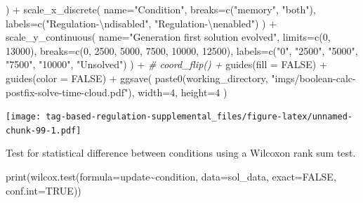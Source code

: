 \documentclass[
]{book}
\newenvironment{Shaded}{\begin{snugshade}}{\end{snugshade}}
\newcommand{\AttributeTok}[1]{\textcolor[rgb]{0.77,0.63,0.00}{#1}}
\newcommand{\CommentTok}[1]{\textcolor[rgb]{0.56,0.35,0.01}{\textit{#1}}}
\newcommand{\ConstantTok}[1]{\textcolor[rgb]{0.00,0.00,0.00}{#1}}
\newcommand{\DecValTok}[1]{\textcolor[rgb]{0.00,0.00,0.81}{#1}}
\newcommand{\FunctionTok}[1]{\textcolor[rgb]{0.00,0.00,0.00}{#1}}
\newcommand{\NormalTok}[1]{#1}
\newcommand{\SpecialCharTok}[1]{\textcolor[rgb]{0.00,0.00,0.00}{#1}}
\newcommand{\StringTok}[1]{\textcolor[rgb]{0.31,0.60,0.02}{#1}}
\begin{document}
\begin{Shaded}
\begin{Highlighting}[]
\NormalTok{  ) }\SpecialCharTok{+}
  \FunctionTok{scale\_x\_discrete}\NormalTok{(}
    \AttributeTok{name=}\StringTok{"Condition"}\NormalTok{,}
    \AttributeTok{breaks=}\FunctionTok{c}\NormalTok{(}\StringTok{"memory"}\NormalTok{, }\StringTok{"both"}\NormalTok{),}
    \AttributeTok{labels=}\FunctionTok{c}\NormalTok{(}\StringTok{"Regulation{-}}\SpecialCharTok{\textbackslash{}n}\StringTok{disabled"}\NormalTok{, }\StringTok{"Regulation{-}}\SpecialCharTok{\textbackslash{}n}\StringTok{enabled"}\NormalTok{)}
\NormalTok{  ) }\SpecialCharTok{+}
  \FunctionTok{scale\_y\_continuous}\NormalTok{(}
    \AttributeTok{name=}\StringTok{"Generation first solution evolved"}\NormalTok{,}
    \AttributeTok{limits=}\FunctionTok{c}\NormalTok{(}\DecValTok{0}\NormalTok{, }\DecValTok{13000}\NormalTok{),}
    \AttributeTok{breaks=}\FunctionTok{c}\NormalTok{(}\DecValTok{0}\NormalTok{, }\DecValTok{2500}\NormalTok{, }\DecValTok{5000}\NormalTok{, }\DecValTok{7500}\NormalTok{, }\DecValTok{10000}\NormalTok{, }\DecValTok{12500}\NormalTok{),}
    \AttributeTok{labels=}\FunctionTok{c}\NormalTok{(}\StringTok{"0"}\NormalTok{, }\StringTok{"2500"}\NormalTok{, }\StringTok{"5000"}\NormalTok{, }\StringTok{"7500"}\NormalTok{, }\StringTok{"10000"}\NormalTok{, }\StringTok{"Unsolved"}\NormalTok{)}
\NormalTok{  ) }\SpecialCharTok{+}
  \CommentTok{\# coord\_flip() +}
  \FunctionTok{guides}\NormalTok{(}\AttributeTok{fill =} \ConstantTok{FALSE}\NormalTok{) }\SpecialCharTok{+}
  \FunctionTok{guides}\NormalTok{(}\AttributeTok{color =} \ConstantTok{FALSE}\NormalTok{) }\SpecialCharTok{+}
  \FunctionTok{ggsave}\NormalTok{(}
    \FunctionTok{paste0}\NormalTok{(working\_directory, }\StringTok{"imgs/boolean{-}calc{-}postfix{-}solve{-}time{-}cloud.pdf"}\NormalTok{),}
    \AttributeTok{width=}\DecValTok{4}\NormalTok{,}
    \AttributeTok{height=}\DecValTok{4}
\NormalTok{  )}
\end{Highlighting}
\end{Shaded}

\texttt{[image: tag-based-regulation-supplemental\_files/figure-latex/unnamed-chunk-99-1.pdf]}

Test for statistical difference between conditions using a Wilcoxon rank sum test.

\begin{Shaded}
\begin{Highlighting}[]
\FunctionTok{print}\NormalTok{(}\FunctionTok{wilcox.test}\NormalTok{(}\AttributeTok{formula=}\NormalTok{update}\SpecialCharTok{\textasciitilde{}}\NormalTok{condition, }\AttributeTok{data=}\NormalTok{sol\_data, }\AttributeTok{exact=}\ConstantTok{FALSE}\NormalTok{, }\AttributeTok{conf.int=}\ConstantTok{TRUE}\NormalTok{))}
\end{Highlighting}
\end{Shaded}
\end{document}
